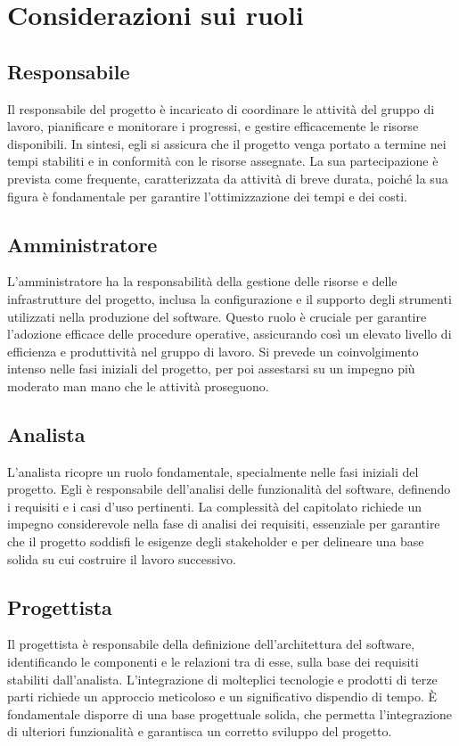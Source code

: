 \documentclass[a4paper, 12pt]{article}
\begin{document}
\tableofcontents
\newpage

\section{Considerazioni sui ruoli}
\subsection{Responsabile}
Il responsabile del progetto è incaricato di coordinare le attività del gruppo di lavoro, pianificare e monitorare i progressi, e gestire efficacemente le risorse disponibili. 
In sintesi, egli si assicura che il progetto venga portato a termine nei tempi stabiliti e in conformità con le risorse assegnate. La sua partecipazione è prevista come frequente, caratterizzata da attività di breve durata,
poiché la sua figura è fondamentale per garantire l’ottimizzazione dei tempi e dei costi.
\subsection{Amministratore}
L’amministratore ha la responsabilità della gestione delle risorse e delle infrastrutture del progetto, inclusa la configurazione e il supporto degli strumenti utilizzati nella produzione del software. 
Questo ruolo è cruciale per garantire l'adozione efficace delle procedure operative, assicurando così un elevato livello di efficienza e produttività nel gruppo di lavoro. 
Si prevede un coinvolgimento intenso nelle fasi iniziali del progetto, per poi assestarsi su un impegno più moderato man mano che le attività proseguono.
\subsection{Analista}
L’analista ricopre un ruolo fondamentale, specialmente nelle fasi iniziali del progetto. Egli è responsabile dell’analisi delle funzionalità del software, definendo i requisiti e i casi d’uso pertinenti. 
La complessità del capitolato richiede un impegno considerevole nella fase di analisi dei requisiti, essenziale per garantire che il progetto soddisfi le esigenze degli stakeholder e per delineare una base solida su cui costruire il lavoro successivo.
\subsection{Progettista}
Il progettista è responsabile della definizione dell'architettura del software, identificando le componenti e le relazioni tra di esse, sulla base dei requisiti stabiliti dall’analista. 
L'integrazione di molteplici tecnologie e prodotti di terze parti richiede un approccio meticoloso e un significativo dispendio di tempo. 
È fondamentale disporre di una base progettuale solida, che permetta l'integrazione di ulteriori funzionalità e garantisca un corretto sviluppo del progetto.
\end{document}
